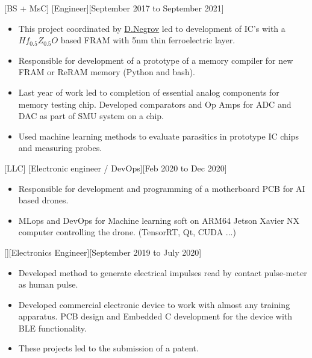 \documentclass{article}
\begin{document}
[BS + MsC]
[Engineer][September 2017 to September 2021]

\begin{itemize}
\item This project coordinated by  \href{https://www.scopus.com/authid/detail.uri?authorId=56272708000}{D.Negrov}   led to development of IC's with a $Hf_{0.5} Z_{0.5} O $ based  FRAM with 5nm thin ferroelectric layer.
\item Responsible for development of a prototype of a memory  compiler for new FRAM or ReRAM memory (Python and bash).
\item Last year of work led to completion of essential analog components for memory testing chip. Developed comparators and Op Amps for ADC and DAC as part of SMU system on a chip.
\item Used machine learning methods to evaluate parasitics in prototype IC chips and measuring probes.

\end{itemize}
 

 
[LLC]
[Electronic engineer / DevOps][Feb 2020 to Dec 2020]
 
\begin{itemize}
\item Responsible for development and programming of a motherboard PCB for AI based drones.
\item MLops and DevOps for Machine learning soft on ARM64 Jetson Xavier NX computer controlling the drone. (TensorRT, Qt, CUDA ...)
\end{itemize}
 
 
[][Electronics Engineer][September 2019 to July 2020]
 
\begin{itemize}
\item Developed method to generate electrical impulses read by contact pulse-meter as human pulse. 
\item Developed commercial electronic device to work with almost any training apparatus. PCB design and Embedded C development for the device with BLE functionality. 
\item These projects led to the submission of a patent.
\end{itemize}
 
\end{document}
